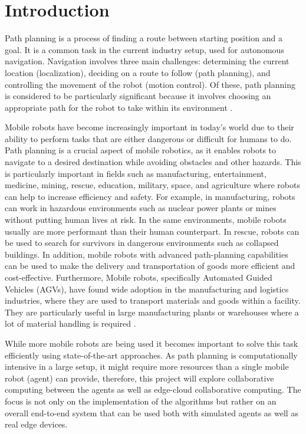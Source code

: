\chapter{Introduction}

Path planning is a process of finding a route between starting position and a goal. It is a common task in the current industry setup, used for autonomous navigation. Navigation involves three main challenges: determining the current location (localization), deciding on a route to follow (path planning), and controlling the movement of the robot (motion control). Of these, path planning is considered to be particularly significant because it involves choosing an appropriate path for the robot to take within its environment \cite{path_lanning_intro}. 

Mobile robots have become increasingly important in today's world due to their ability to perform tasks that are either dangerous or difficult for humans to do. Path planning is a crucial aspect of mobile robotics, as it enables robots to navigate to a desired destination while avoiding obstacles and other hazards. This is particularly important in fields such as manufacturing, entertainment, medicine, mining, rescue, education, military, space, and agriculture where robots can help to increase efficiency and safety. For example, in manufacturing, robots can work in hazardous environments such as nuclear power plants or mines without putting human lives at risk. In the same environments, mobile robots usually are more performant than their human counterpart. In rescue, robots can be used to search for survivors in dangerous environments such as collapsed buildings. In addition, mobile robots with advanced path-planning capabilities can be used to make the delivery and transportation of goods more efficient and cost-effective. Furthermore, Mobile robots, specifically Automated Guided Vehicles (AGVs), have found wide adoption in the manufacturing and logistics industries, where they are used to transport materials and goods within a facility. They are particularly useful in large manufacturing plants or warehouses where a lot of material handling is required \cite{intro_mobile_robots}. 

While more mobile robots are being used it becomes important to solve this task efficiently using state-of-the-art approaches. As path planning is computationally intensive in a large setup, it might require more resources than a single mobile robot (agent) can provide, therefore, this project will explore collaborative computing between the agents as well as edge-cloud collaborative computing. The focus is not only on the implementation of the algorithms but rather on an overall end-to-end system that can be used both with simulated agents as well as real edge devices.

